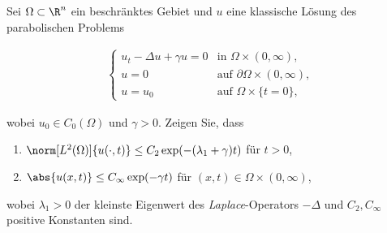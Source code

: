 
\begin{exercise}

Sei $\Omega \subset \R^n$ ein beschränktes Gebiet und $u$ eine klassische Lösung des parabolischen Problems

\begin{align*}
  \begin{cases}
      u_t - \Delta u + \gamma u = 0 & \text{in } \Omega \times (0,\infty), \\
      u = 0 & \text{auf } \partial\Omega \times (0,\infty), \\
      u = u_0 & \text{auf } \Omega \times \{t = 0\},
  \end{cases}
\end{align*}

wobei $u_0 \in C_0(\Omega)$ und $\gamma > 0$.
Zeigen Sie, dass

\begin{enumerate}[label = (\roman*)]
  \item $\norm[L^2(\Omega)]{u(\cdot, t)} \leq C_2 \exp(-(\lambda_1 + \gamma)t)$ für $t > 0$,
  \item $\abs{u(x, t)} \leq C_\infty \exp(-\gamma t)$ für $(x, t) \in \Omega \times (0, \infty)$,
\end{enumerate}

wobei $\lambda_1 > 0$ der kleinste Eigenwert des \textit{Laplace}-Operators $-\Delta$ und $C_2, C_\infty$ positive Konstanten sind.

\end{exercise}


